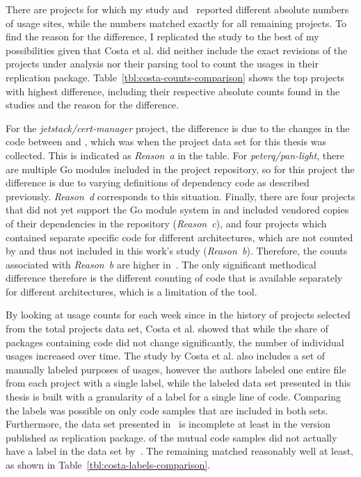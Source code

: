There are  projects for which my study and~\cite{costa2020} reported different absolute numbers of
\unsafe{} usage sites, while the numbers matched exactly for all remaining projects.
To find the reason for the difference, I replicated the study to the best of my possibilities given that Costa et al.
did neither include the exact revisions of the projects under analysis nor their parsing tool to count the \unsafe{}
usages in their replication package.
Table~\ref{tbl:costa-counts-comparison} shows the top  projects with highest difference, including their
respective absolute counts found in the studies and the reason for the difference.



For the \textit{jetstack/cert-manager} project, the difference is due to the changes in the code between
 and , which was when the project data set for this thesis was collected.
This is indicated as \textit{Reason~a} in the table.
For \textit{peterq/pan-light}, there are multiple Go modules included in the project repository, so for this project
the difference is due to varying definitions of dependency code as described previously.
\textit{Reason~d} corresponds to this situation.
Finally, there are four projects that did not yet support the Go module system in  and included
vendored copies of their dependencies in the repository (\textit{Reason~c}), and four projects which contained separate
specific code for different architectures, which are not counted by \toolGeiger{} and thus not included in this work's
study (\textit{Reason~b}).
Therefore, the counts associated with \textit{Reason~b} are higher in~\cite{costa2020}.
The only significant methodical difference therefore is the different counting of code that is available separately for
different architectures, which is a limitation of the \toolGeiger{} tool.

By looking at \unsafe{} usage counts for each week since  in the history of  projects
selected from the total projects data set, Costa et al. showed that while the share of packages containing \unsafe{}
code did not change significantly, the number of individual \unsafe{} usages increased over time.
The study by Costa et al. also includes a set of manually labeled purposes of \unsafe{} usages, however the authors
labeled one entire file from each project with a single label, while the labeled data set presented in this thesis is
built with a granularity of a label for a single line of code.
Comparing the labels was possible on only  code samples that are included in both sets.
Furthermore, the data set presented in~\cite{costa2020} is incomplete at least in the version published as replication
package.
 of the  mutual code samples did not actually have a label in the data set
by~\cite{costa2020}.
The remaining  matched reasonably well at least, as shown in Table~\ref{tbl:costa-labels-comparison}.

